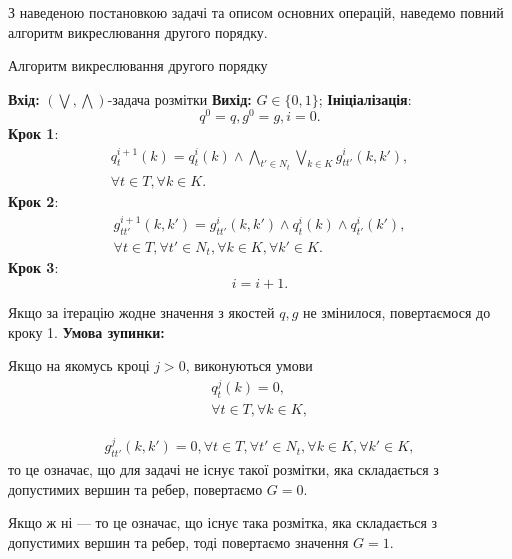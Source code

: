 З наведеною постановкою задачі та описом основних операцій, наведемо повний 
алгоритм викреслювання другого порядку.

\begin{algorithm}[H]
    \caption{Алгоритм викреслювання другого порядку}
    \begin{algorithmic}
    \State \textbf{Вхід:} $(\bigvee, \bigwedge)$-задача розмітки
    \State \textbf{Вихід:} $G\in\{0,1\}$;
    \State \textbf{Ініціалізація}: 
    \begin{equation}
    q^0=q, g^0=g, i=0.
    \end{equation}
    \State \textbf{Крок 1}: 
    \begin{equation}
        \begin{aligned}
        q^{i+1}_t(k) = q^i_t(k)\wedge\bigwedge_{t'\in N_t}\bigvee_{k\in K}g^i_{tt'}(k,k'),\\
        \forall t\in T, \forall k\in K.
    \end{aligned}
    \end{equation}
    \State \textbf{Крок 2}: 
    \begin{equation}
        \begin{aligned}
        g^{i+1}_{tt'}(k,k') = g^i_{tt'}(k,k')\wedge q^i_t(k)\wedge q^i_{t'}(k'),\\
        \forall t\in T, \forall t'\in N_t,  \forall k\in K, \forall k'\in K.
    \end{aligned}
    \end{equation}
    \State \textbf{Крок 3}: 
    \begin{equation}
        i = i+1.
    \end{equation}

Якщо за ітерацію жодне значення з якостей $q, g$ не змінилося, повертаємося до кроку 1.
\State \textbf{Умова зупинки:}

Якщо на якомусь кроці $j>0$, виконуються умови
\begin{equation}
    \begin{aligned}
    q^{j}_t(k) = 0, \\
    \forall t\in T, \forall k\in K,
\end{aligned}
\end{equation}

\begin{equation}
    \begin{aligned}
g^{j}_{tt'}(k,k') = 0, 
\forall t\in T, \forall t'\in N_t,  \forall k\in K, \forall k'\in K,
\end{aligned}
\end{equation}
то це означає, що для задачі не існує такої розмітки, яка складається
з допустимих вершин та ребер, повертаємо $G=0$.

Якщо ж ні --- то це означає, що існує така розмітка, яка складається
з допустимих вершин та ребер, тоді повертаємо значення $G=1$.
\end{algorithmic}
\end{algorithm}


